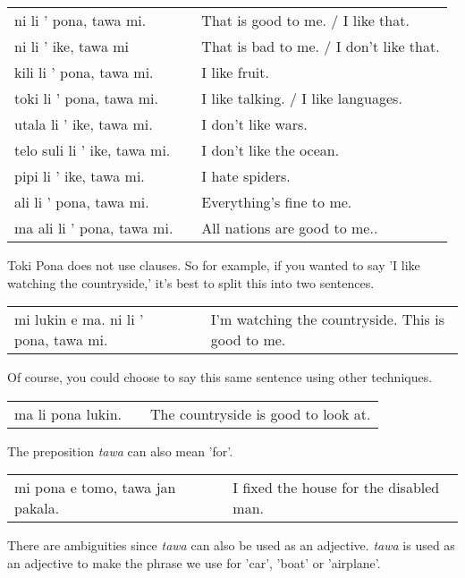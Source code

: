 \begin{supertabular}{p{5,5cm}|ll}
ni li ' pona, tawa mi. && That is good to me. / I like that. \\
ni li ' ike, tawa mi && That is bad to me. / I don't like that. \\
kili li ' pona, tawa mi. && I like fruit. \\
toki li ' pona, tawa mi. && I like talking. / I like languages. \\
utala li ' ike, tawa mi. && I don't like wars. \\
telo suli li ' ike, tawa mi. && I don't like the ocean. \\
pipi li ' ike, tawa mi. && I hate spiders. \\
ali li ' pona, tawa mi. && Everything's fine to me.  \\
ma ali li ' pona, tawa mi. && All nations are good to me.. \\
\end{supertabular} 

%
%
Toki Pona does not use clauses. 
So for example, if you wanted to say 'I like watching the countryside,' it's best to split this into two sentences.

\begin{supertabular}{p{5,5cm}|ll}
mi lukin e ma. ni li ' pona, tawa mi. && I'm watching the countryside. This is good to me.\\
\end{supertabular} 

Of course, you could choose to say this same sentence using other techniques. 

\begin{supertabular}{p{5,5cm}|ll}
ma li pona lukin. && The countryside is good to look at. \\
\end{supertabular} 

%
The preposition \textit{tawa} can also mean 'for'.
 
\begin{supertabular}{p{5,5cm}|ll}
mi pona e tomo, tawa jan pakala. && I fixed the house for the disabled man. \\
\end{supertabular} 

% 
There are ambiguities since \textit{tawa} can also be used as an adjective. 
\textit{tawa} is used as an adjective to make the phrase we use for 'car', 'boat' or 'airplane'.

